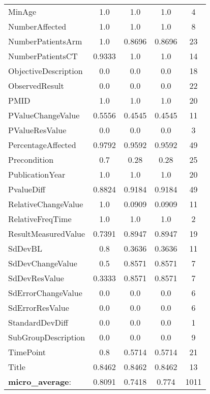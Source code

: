 \begin{longtable}{ l c c c c}
MinAge & 1.0 & 1.0 & 1.0 & 4\\
NumberAffected & 1.0 & 1.0 & 1.0 & 8\\
NumberPatientsArm & 1.0 & 0.8696 & 0.8696 & 23\\
NumberPatientsCT & 0.9333 & 1.0 & 1.0 & 14\\
ObjectiveDescription & 0.0 & 0.0 & 0.0 & 18\\
ObservedResult & 0.0 & 0.0 & 0.0 & 22\\
PMID & 1.0 & 1.0 & 1.0 & 20\\
PValueChangeValue & 0.5556 & 0.4545 & 0.4545 & 11\\
PValueResValue & 0.0 & 0.0 & 0.0 & 3\\
PercentageAffected & 0.9792 & 0.9592 & 0.9592 & 49\\
Precondition & 0.7 & 0.28 & 0.28 & 25\\
PublicationYear & 1.0 & 1.0 & 1.0 & 20\\
PvalueDiff & 0.8824 & 0.9184 & 0.9184 & 49\\
RelativeChangeValue & 1.0 & 0.0909 & 0.0909 & 11\\
RelativeFreqTime & 1.0 & 1.0 & 1.0 & 2\\
ResultMeasuredValue & 0.7391 & 0.8947 & 0.8947 & 19\\
SdDevBL & 0.8 & 0.3636 & 0.3636 & 11\\
SdDevChangeValue & 0.5 & 0.8571 & 0.8571 & 7\\
SdDevResValue & 0.3333 & 0.8571 & 0.8571 & 7\\
SdErrorChangeValue & 0.0 & 0.0 & 0.0 & 6\\
SdErrorResValue & 0.0 & 0.0 & 0.0 & 6\\
StandardDevDiff & 0.0 & 0.0 & 0.0 & 1\\
SubGroupDescription & 0.0 & 0.0 & 0.0 & 9\\
TimePoint & 0.8 & 0.5714 & 0.5714 & 21\\
Title & 0.8462 & 0.8462 & 0.8462 & 13\\
\textbf{micro\_average}: & 0.8091 & 0.7418 & 0.774 & 1011 
\label{tab:Diabetes_eventextr}
\end{longtable}
